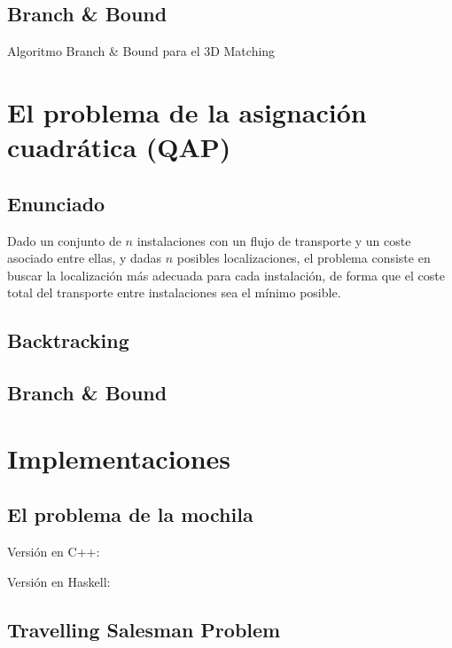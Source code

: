 \documentclass[a4paper, 11pt]{article} %
\begin{document}
  \subsection{Branch \& Bound}
    \begin{algorithm}[H]
    	\begin{algorithmic}[1]
		\REQUIRE 
    	\end{algorithmic}
        \caption{Algoritmo Branch \& Bound para el 3D Matching}
        \label{BBound-3DMatch}
    \end{algorithm}

\section{El problema de la asignación cuadrática (QAP)}
  \subsection{Enunciado}
   Dado un conjunto de $n$ instalaciones con un flujo de transporte y un coste asociado entre ellas, y dadas $n$ posibles localizaciones, el problema consiste en buscar la localización más adecuada para cada instalación, de forma que el coste total del transporte entre instalaciones sea el mínimo posible. 

  \subsection{Backtracking}
  \subsection{Branch \& Bound}


\section{Implementaciones}
  \subsection{El problema de la mochila}
        Versión en C++:
        
        \small
  	\texttt{}
        \normalsize
        
        Versión en Haskell:
        
        \small
  	\texttt{}
        \normalsize
        
  \subsection{Travelling Salesman Problem}
        \small
  	\texttt{}
        \normalsize
\end{document}
